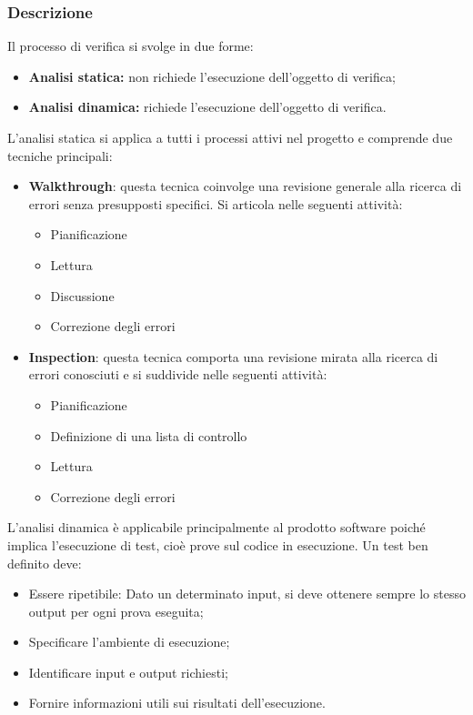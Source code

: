\subsubsection{Descrizione}
Il processo di verifica si svolge in due forme:
\begin{itemize}
    \item \textbf{Analisi statica:} non richiede l'esecuzione dell'oggetto di verifica;
    \item \textbf{Analisi dinamica: } richiede l'esecuzione dell'oggetto di verifica.
\end{itemize}
L'analisi statica si applica a tutti i processi attivi nel progetto e comprende due tecniche principali:
\begin{itemize}
    \item \textbf{Walkthrough}: questa tecnica coinvolge una revisione generale alla ricerca di errori
    senza presupposti specifici. Si articola nelle seguenti attività:
    \begin{itemize}
        \item Pianificazione
        \item Lettura
        \item Discussione
        \item Correzione degli errori
    \end{itemize}
    \item \textbf{Inspection}: questa tecnica comporta una revisione mirata alla ricerca di errori conosciuti
    e si suddivide nelle seguenti attività:
    \begin{itemize}
        \item Pianificazione
        \item Definizione di una lista di controllo
        \item Lettura
        \item Correzione degli errori
    \end{itemize}
\end{itemize}
L'analisi dinamica è applicabile principalmente al prodotto software
poiché implica l'esecuzione di test, cioè prove sul codice in esecuzione.
Un test ben definito deve:
\begin{itemize}
    \item Essere ripetibile: Dato un determinato input, si deve ottenere sempre
    lo stesso output per ogni prova eseguita;
    \item Specificare l'ambiente di esecuzione;
    \item Identificare input e output richiesti;
    \item Fornire informazioni utili sui risultati dell'esecuzione.
\end{itemize}

